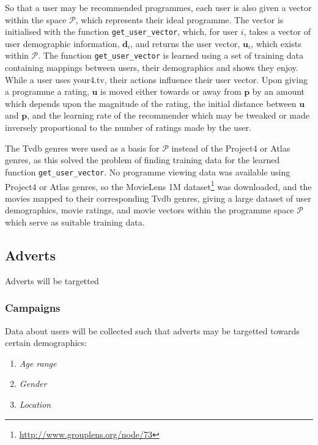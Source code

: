 So that a user may be recommended programmes, each user is also given a vector within the space $\mathcal{P}$, which represents their ideal programme. The vector is initialised with the function \texttt{get\_user\_vector}, which, for user $i$, takes a vector of user demographic information, $\mathbf{d}_{i}$, and returns the user vector, $\mathbf{u}_{i}$, which exists within $\mathcal{P}$. The function \texttt{get\_user\_vector} is learned using a set of training data containing mappings between users, their demographics and shows they enjoy. While a user uses your4.tv, their actions influence their user vector. Upon giving a programme a rating, $\mathbf{u}$ is moved either towards or away from $\mathbf{p}$ by an amount which depends upon the magnitude of the rating, the initial distance between $\mathbf{u}$ and $\mathbf{p}$, and the learning rate of the recommender which may be tweaked or made inversely proportional to the number of ratings made by the user.

The Tvdb genres were used as a basis for $\mathcal{P}$ instead of the Project4 or Atlas genres, as this solved the problem of finding training data for the learned function \texttt{get\_user\_vector}. No programme viewing data was available using Project4 or Atlas genres, so the MovieLens 1M dataset\footnote{\url{http://www.grouplens.org/node/73}} was downloaded, and the movies mapped to their corresponding Tvdb genres, giving a large dataset of user demographics, movie ratings, and movie vectors within the programme space $\mathcal{P}$ which serve as suitable training data.



\subsection{Adverts}
\label{sec:design_adverts}

Adverts will be targetted

\subsubsection{Campaigns}

Data about users will be collected such that adverts may be targetted towards certain demographics:
\begin{enumerate}
\item \textit{Age range}
\item \textit{Gender}
\item \textit{Location}
\end{enumerate}

